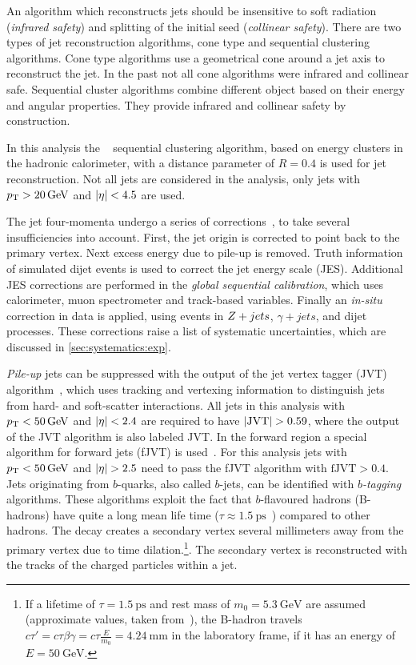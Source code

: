 An algorithm which reconstructs jets should be insensitive to soft radiation (\emph{infrared safety})
and splitting of the initial seed (\emph{collinear safety}).
There are two types of jet reconstruction algorithms, cone type and sequential clustering algorithms.
Cone type algorithms use a geometrical cone around a jet axis to reconstruct the jet. In the past not
all cone algorithms were infrared and collinear safe.
Sequential cluster algorithms combine different object based on their energy and angular properties.
They provide infrared and collinear safety by construction.

In this analysis the \antikt{}~\cite{Cacciari:2008gp,Cacciari:2005hq} sequential clustering algorithm, based on energy clusters in the
hadronic calorimeter, with a distance parameter of $R = 0.4$ is used for jet reconstruction.
Not all jets are considered in the analysis, only jets with $\pt > \SI{20}{\GeV}$ and $\left|\eta\right| < 4.5$ are used.

The jet four-momenta undergo a series of corrections~\cite{PERF-2016-04}, to take several insufficiencies into account.
First, the jet origin is corrected to point back to the primary vertex. Next excess energy due to pile-up is removed.
Truth information of simulated dijet events is used to correct the jet energy scale (JES).
Additional JES corrections are performed in the \emph{global sequential calibration}, which uses calorimeter, muon
spectrometer and track-based variables. Finally an \emph{in-situ} correction in data is applied, using events
in $Z+jets$, $\gamma + jets$, and dijet processes.
These corrections raise a list of systematic uncertainties, which are discussed in \cref{sec:systematics:exp}.

\emph{Pile-up} jets can be suppressed with the output of the jet vertex tagger (JVT) algorithm~\cite{PERF-2014-03}, which
uses tracking and vertexing information to distinguish jets from hard- and soft-scatter interactions.
All jets in this analysis with $\pt < \SI{50}{\GeV}$ and $\left|\eta\right| < 2.4$ are required to have $\left|\text{JVT}\right| > 0.59$, where the output of the
JVT algorithm is also labeled JVT\@.
In the forward region a special algorithm for forward jets (fJVT) is used~\cite{ATL-PHYS-PUB-2015-034}.
For this analysis jets with $\pt < \SI{50}{\GeV}$ and $\left|\eta\right| > 2.5$ need to pass the fJVT algorithm with
$\text{fJVT} > 0.4$.
\\[\baselineskip]
Jets originating from $b$-quarks, also called $b$-jets, can be identified with \emph{$b$-tagging} algorithms.
These algorithms exploit the fact that $b$-flavoured hadrons (B-hadrons) have quite a long mean life time
($\tau \approx \SI{1.5}{\ps}$~\cite{PDG}) compared to other hadrons.
The decay creates a secondary vertex several millimeters away from the primary vertex due to time
dilation.\footnote{If a lifetime of $\tau = \SI{1.5}{\ps}$ and rest mass of $m_0 = \SI{5.3}{\GeV}$ are assumed (approximate values, taken from~\cite{PDG}),
the B-hadron travels $c\tau' = c \tau \beta \gamma = c \tau \frac{E}{m_0} = \SI{4.24}{\mm}$ in the laboratory frame, if it has an energy of $E = \SI{50}{\GeV}$.}.
The secondary vertex is reconstructed with the tracks of the charged particles within a jet.


